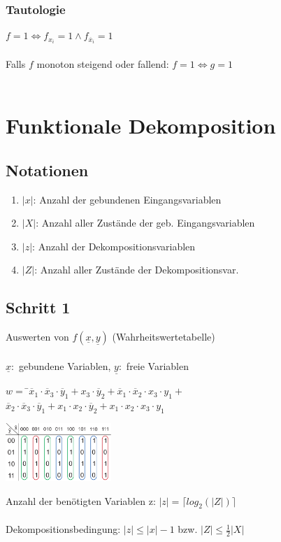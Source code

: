 \documentclass[a4paper,twocolumn,10pt]{article}
\begin{document}
\subsubsection*{Tautologie}
$f=1\Leftrightarrow f_{x_i}=1 \wedge f_{\overline{x}_i}=1$\\\\
Falls $f$ monoton steigend oder fallend: $f=1\Leftrightarrow g=1$\\\\

\section*{Funktionale Dekomposition}
\subsection*{Notationen}
\begin{enumerate}[label=-]
	\item $|x|$: Anzahl der gebundenen Eingangsvariablen
	\item $|X|$: Anzahl aller Zustände der geb. Eingangsvariablen
	\item $|z|$: Anzahl der Dekompositionsvariablen
	\item $|Z|$: Anzahl aller Zustände der Dekompositionsvar.
\end{enumerate}

\subsection*{Schritt 1}
Auswerten von $f(\underline{x}, \underline{y})$ (Wahrheitswertetabelle)\\\\
$\underline{x}:$ gebundene Variablen, $\underline{y}:$ freie Variablen
\begin{tabbing}
$w=$ \=$\overline{x}_1\cdot \overline{x}_3\cdot \overline{y}_1+x_3\cdot \overline{y}_2+\overline{x}_1\cdot\overline{x}_2\cdot x_3\cdot y_1+$\\
\>$\overline{x}_2\cdot \overline{x}_3\cdot\overline{y}_1+x_1\cdot x_2\cdot \overline{y}_2+x_1\cdot x_2\cdot x_3\cdot y_1$
\end{tabbing}
\begin{center}
\includegraphics[width=0.3\textwidth]{Grafiken/Dekomposition1}
\end{center}
Anzahl der benötigten Variablen z: $|z|=\lceil log_2(|Z|)\rceil$\\\\
Dekompositionsbedingung: $|z| \leq |x|-1$ bzw. $|Z|\leq \frac{1}{2}|X|$
\end{document}

